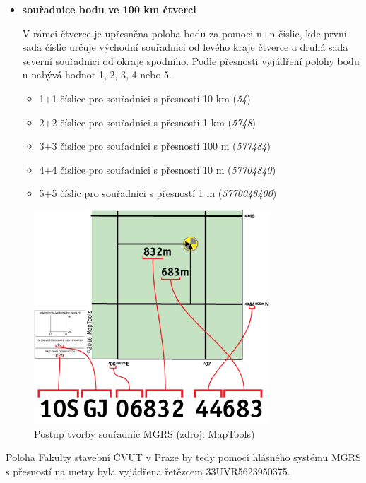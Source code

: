 \begin{itemize}
	\item \textbf{souřadnice bodu ve 100 km čtverci}
	
          V rámci čtverce je upřesněna poloha bodu za pomoci n+n
          číslic, kde první sada číslic určuje východní souřadnici od
          levého kraje čtverce a druhá sada severní souřadnici od
          okraje spodního. Podle přesnosti vyjádření polohy bodu n
          nabývá hodnot 1, 2, 3, 4 nebo 5.
	
		\begin{itemize}
				\item 1+1 číslice pro souřadnici s přesností 10 km (\textit{54})
				\item 2+2 číslice pro souřadnici s přesností 1 km (\textit{5748})
				\item 3+3 číslice pro souřadnici s přesností 100 m (\textit{577484})
				\item 4+4 číslice pro souřadnici s přesností 10 m (\textit{57704840})
				\item 5+5 číslic pro souřadnici s přesností 1 m (\textit{5770048400})
		\end{itemize}	
		 
\end{itemize}

\begin{figure}[H]
    \centering
      \includegraphics[width=250pt]{./pictures/MGRS_tvorba.png}
      \caption[Postup tvorby souřadnic MGRS]{Postup tvorby souřadnic MGRS
      (zdroj: \href{https://www.maptools.com/tutorials/mgrs/quick_guide}{MapTools})}
      \label{fig:maptools}
\end{figure}
  
Poloha Fakulty stavební ČVUT v Praze by tedy pomocí hlásného systému
MGRS s přesností na metry byla vyjádřena řetězcem 33UVR5623950375.

